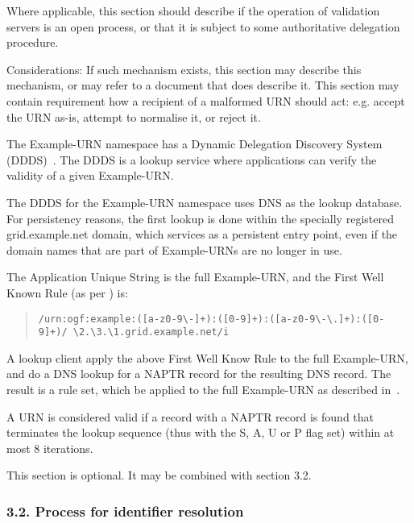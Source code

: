 \documentclass[12pt]{article}  %
\begin{document}
Where applicable, this section should describe if the operation of 
validation servers is an open process, or that it is subject to 
some authoritative delegation procedure.

Considerations: If such mechanism exists, this section may describe 
this mechanism, or may refer to a document that does describe it.
This section may contain requirement how a recipient of a malformed 
URN should act: e.g. accept the URN as-is, attempt to normalise it, or 
reject it.

\begin{example}
The Example-URN namespace has a Dynamic Delegation Discovery System 
(DDDS)~\cite{rfc3402}. The DDDS is a lookup service where applications 
can verify the validity of a given Example-URN.

The DDDS for the Example-URN namespace uses DNS as the lookup database.
For persistency reasons, the first lookup is done within the specially 
registered grid.example.net domain, which services as a persistent entry 
point, even if the domain names that are part of Example-URNs are no longer 
in use.

The Application Unique String is the full Example-URN, and the First Well 
Known Rule (as per \cite{rfc3402}) is:

\begin{quote}
\texttt{/urn:ogf:example:([a-z0-9\textbackslash{}-]+):([0-9]+):([a-z0-9\textbackslash{}-\textbackslash{}.]+):([0-9]+)/ \textbackslash{}2.\textbackslash{}3.\textbackslash{}1.grid.example.net/i}
\end{quote}

A lookup client \SHOULD{} apply the above First Well Know Rule to the full 
Example-URN, and do a DNS lookup for a NAPTR record for the resulting DNS 
record. The result is a rule set, which \MUST{} be applied to the full 
Example-URN as described in~\cite{rfc3402}.

A URN is considered valid if a record with a NAPTR record is found that 
terminates the lookup sequence (thus with the S, A, U or P flag set) 
within at most 8 iterations.
\end{example}

This section is optional. It may be combined with section 3.2.

\subsubsection*{3.2. Process for identifier resolution}
\end{document}

